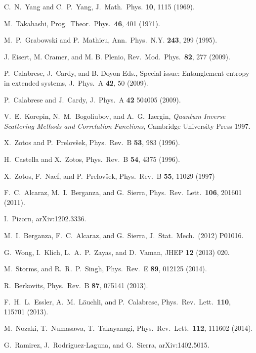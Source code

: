 \documentclass[twocolumn,superscriptaddress,prb,10pt]{revtex4-1}
\begin{document}
\begin{thebibliography}{99}
C.~N.~Yang and C.~P.~Yang, J.\ Math.\ Phys. {\bf 10}, 1115 (1969).

M.~Takahashi, Prog.\ Theor.\ Phys.\ {\bf 46}, 401 (1971). 

M.~P.~Grabowski and P.~Mathieu, Ann.\ Phys.\ N.Y. {\bf 243}, 
299 (1995). 

J. Eisert, M. Cramer, and M. B. Plenio, Rev.\ Mod.\ Phys.\ {\bf 82}, 
277 (2009). 

P.~Calabrese, J.~Cardy, and B. Doyon Eds., Special issue: Entanglement 
entropy in extended systems, J.\ Phys.\ A {\bf 42}, 50 (2009).

P.~Calabrese and J.~Cardy, J.\ Phys.\ A {\bf 42} 504005 (2009).

V.~E.~Korepin, N.~M.~Bogoliubov, and A.~G.~Izergin, \emph{Quantum 
Inverse Scattering Methods and Correlation Functions}, Cambridge 
University Press 1997. 

X.~Zotos and P.~Prelov\v{s}ek, Phys.\ Rev.\ B {\bf 53}, 
983 (1996).

H.~Castella and X.~Zotos, Phys.\ Rev.\ B {\bf 54}, 4375 (1996).

X.~Zotos, F.~Naef, and P.~Prelov\v{s}ek, Phys.\ Rev.\ B {\bf 55}, 
11029 (1997)

F.~C.~Alcaraz, M.~I.~Berganza, and G.~Sierra, Phys.\ Rev.\ Lett.\ 
{\bf 106}, 201601 (2011).

I.~Pizorn, arXiv:1202.3336. 

M.~I.~Berganza, F.~C.~Alcaraz, and G.~Sierra, J.\ Stat.\ Mech.\ 
(2012) P01016. 

G.~Wong, I.~Klich, L.~A.~P.~Zayas, and D.~Vaman, 
JHEP {\bf12} (2013) 020. 

M.~Storms, and R.~R.~P.~Singh, Phys.\ Rev.\ E {\bf 89}, 012125 
(2014). 

R.~Berkovits, Phys.\ Rev.\ B {\bf 87}, 075141 (2013). 

F.~H.~L.~Essler, A.~M.~L\"auchli, and P.~Calabrese, Phys.\ Rev.\ Lett.\ 
{\bf 110}, 115701 (2013).  

\bibitem{nozaki-2014}
M.~Nozaki, T.~Numasawa, T.~Takayanagi, Phys.\ Rev.\ Lett.\ {\bf 112}, 
111602 (2014).

\bibitem{ramirez-2014}
G.~Ramirez, J.~Rodriguez-Laguna, and G.~Sierra, arXiv:1402.5015.


\end{thebibliography}
\end{document}
